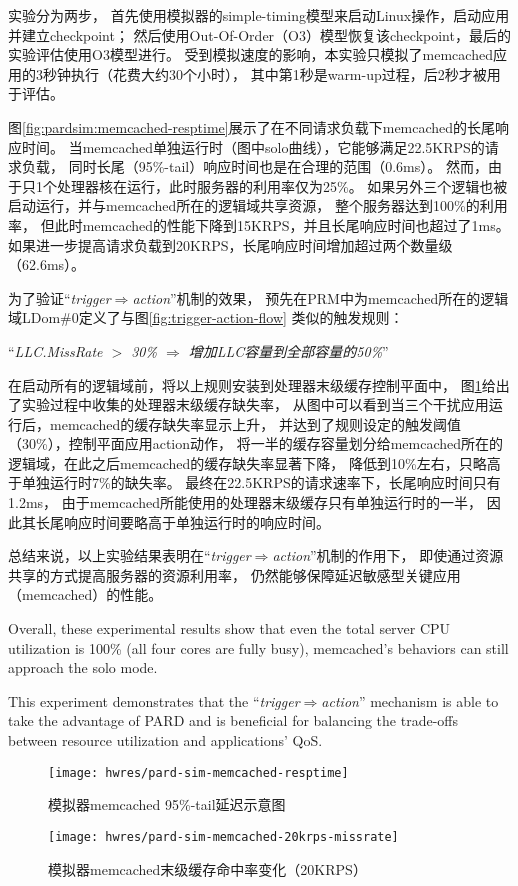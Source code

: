 实验分为两步，
首先使用模拟器的simple-timing模型来启动Linux操作，启动应用并建立checkpoint；
然后使用Out-Of-Order（O3）模型恢复该checkpoint，最后的实验评估使用O3模型进行。
受到模拟速度的影响，本实验只模拟了memcached应用的3秒钟执行（花费大约30个小时），
其中第1秒是warm-up过程，后2秒才被用于评估。

图\ref{fig:pardsim:memcached-resptime}展示了在不同请求负载下memcached的长尾响应时间。
当memcached单独运行时（图中solo曲线），它能够满足22.5KRPS的请求负载，
同时长尾（95\%-tail）响应时间也是在合理的范围（0.6ms）。
然而，由于只1个处理器核在运行，此时服务器的利用率仅为25\%。
如果另外三个逻辑也被启动运行，并与memcached所在的逻辑域共享资源，
整个服务器达到100\%的利用率，
但此时memcached的性能下降到15KRPS，并且长尾响应时间也超过了1ms。
如果进一步提高请求负载到20KRPS，长尾响应时间增加超过两个数量级（62.6ms）。

为了验证``\emph{trigger$\Rightarrow$action}''机制的效果，
预先在PRM中为memcached所在的逻辑域LDom\#0定义了与图\ref{fig:trigger-action-flow}
类似的触发规则：

``\emph{LLC.MissRate $>$ 30\% $\Rightarrow$ 增加LLC容量到全部容量的50\%}''

在启动所有的逻辑域前，将以上规则安装到处理器末级缓存控制平面中，
图\ref{fig:pardsim:memcached-20krps-missrate}给出了实验过程中收集的处理器末级缓存缺失率，
从图中可以看到当三个干扰应用运行后，memcached的缓存缺失率显示上升，
并达到了规则设定的触发阈值（30\%），控制平面应用action动作，
将一半的缓存容量划分给memcached所在的逻辑域，在此之后memcached的缓存缺失率显著下降，
降低到10\%左右，只略高于单独运行时7\%的缺失率。
最终在22.5KRPS的请求速率下，长尾响应时间只有1.2ms，
由于memcached所能使用的处理器末级缓存只有单独运行时的一半，
因此其长尾响应时间要略高于单独运行时的响应时间。

总结来说，以上实验结果表明在``\emph{trigger$\Rightarrow$action}''机制的作用下，
即使通过资源共享的方式提高服务器的资源利用率，
仍然能够保障延迟敏感型关键应用（memcached）的性能。

Overall, these experimental results show that even the total 
server CPU utilization is 100\% (all four cores are fully busy),
memcached's behaviors can still approach the solo mode.

This experiment demonstrates that the ``\emph{trigger$\Rightarrow$action}'' mechanism 
is able to take the advantage of PARD and is beneficial for balancing the trade-offs between
resource utilization and applications' QoS.

\begin{figure}[tb]
\begin{minipage}{0.48\textwidth}
  \centering
  \texttt{[image: hwres/pard-sim-memcached-resptime]}
  \caption{模拟器memcached 95\%-tail延迟示意图}
  \label{fig:pardsim:memcached-resptime}
\end{minipage}\hfill
\begin{minipage}{0.48\textwidth}
  \centering
  \texttt{[image: hwres/pard-sim-memcached-20krps-missrate]}
  \caption{模拟器memcached末级缓存命中率变化（20KRPS）}
  \label{fig:pardsim:memcached-20krps-missrate}
\end{minipage}
\end{figure}

